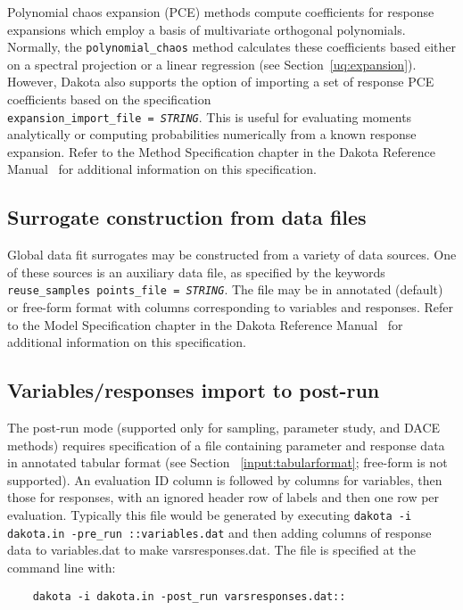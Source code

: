 Polynomial chaos expansion (PCE) methods compute coefficients for
response expansions which employ a basis of multivariate orthogonal
polynomials.  Normally, the \texttt{polynomial\_chaos} method
calculates these coefficients based either on a spectral projection or
a linear regression (see Section~\ref{uq:expansion}).  However,
Dakota also supports the option of importing a set of response PCE
coefficients based on the specification \\
\texttt{expansion\_import\_file = \emph{STRING}}.  This is useful for
evaluating moments analytically or computing probabilities numerically
from a known response expansion.  Refer to the Method Specification
chapter in the Dakota Reference Manual~\cite{RefMan} for additional
information on this specification.

\subsection{Surrogate construction from data files}

Global data fit surrogates may be constructed from a variety of data
sources.  One of these sources is an auxiliary data file, as specified
by the keywords \texttt{reuse\_samples points\_file = \emph{STRING}}.
The file may be in annotated (default) or free-form format with
columns corresponding to variables and responses.  Refer to the Model
Specification chapter in the Dakota Reference Manual~\cite{RefMan} for
additional information on this specification.

\subsection{Variables/responses import to post-run}

The post-run mode (supported only for sampling, parameter study, and
DACE methods) requires specification of a file containing parameter
and response data in annotated tabular format (see Section
~\ref{input:tabularformat}; free-form is not supported).  An
evaluation ID column is followed by columns for variables, then those
for responses, with an ignored header row of labels and then one row
per evaluation.  Typically this file would be generated by executing
\texttt{dakota -i dakota.in -pre\_run ::variables.dat} and then adding
columns of response data to variables.dat to make varsresponses.dat.
The file is specified at the command line with:
\begin{small}
\begin{verbatim}
    dakota -i dakota.in -post_run varsresponses.dat::
\end{verbatim}
\end{small}

